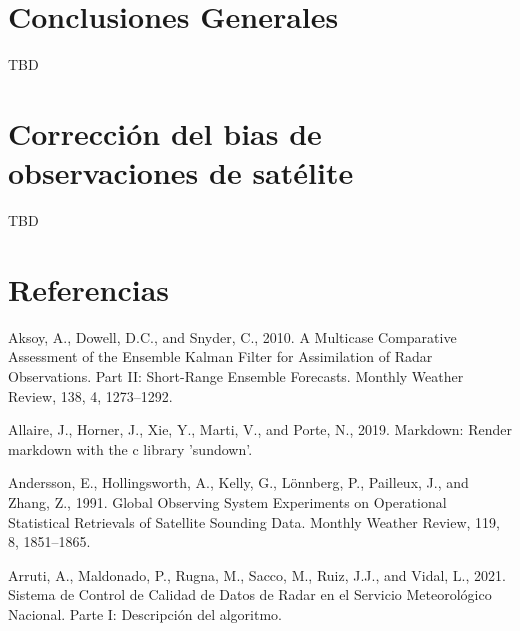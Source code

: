 \documentclass[12pt,oneside,a4paper]{reedthesis}
\begin{document}
\hypertarget{conclusiones-generales}{%
\chapter*{Conclusiones Generales}\label{conclusiones-generales}}

TBD

\appendix

\hypertarget{correcciuxf3n-del-bias-de-observaciones-de-satuxe9lite}{%
\chapter{Corrección del bias de observaciones de satélite}\label{correcciuxf3n-del-bias-de-observaciones-de-satuxe9lite}}

TBD

\backmatter

\hypertarget{referencias}{%
\chapter*{Referencias}\label{referencias}}


\noindent

\setlength{\parindent}{-0.20in}

\hypertarget{refs}{}
\leavevmode\hypertarget{ref-aksoy2010}{}%
Aksoy, A., Dowell, D.C., and Snyder, C., 2010. A Multicase Comparative Assessment of the Ensemble Kalman Filter for Assimilation of Radar Observations. Part II: Short-Range Ensemble Forecasts. Monthly Weather Review, 138, 4, 1273--1292.

\leavevmode\hypertarget{ref-allaire2019}{}%
Allaire, J., Horner, J., Xie, Y., Marti, V., and Porte, N., 2019. Markdown: Render markdown with the c library 'sundown'.

\leavevmode\hypertarget{ref-andersson1991}{}%
Andersson, E., Hollingsworth, A., Kelly, G., Lönnberg, P., Pailleux, J., and Zhang, Z., 1991. Global Observing System Experiments on Operational Statistical Retrievals of Satellite Sounding Data. Monthly Weather Review, 119, 8, 1851--1865.

\leavevmode\hypertarget{ref-arruti2021}{}%
Arruti, A., Maldonado, P., Rugna, M., Sacco, M., Ruiz, J.J., and Vidal, L., 2021. Sistema de Control de Calidad de Datos de Radar en el Servicio Meteorológico Nacional. Parte I: Descripción del algoritmo.
\end{document}
